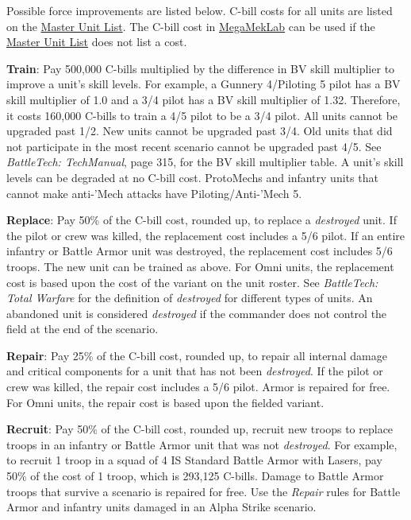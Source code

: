 Possible force improvements are listed below.
C-bill costs for all units are listed on the \href{http://www.masterunitlist.info}{Master Unit List}.
The C-bill cost in \href{https://megamek.org}{MegaMekLab} can be used if the \href{http://www.masterunitlist.info}{Master Unit List} does not list a cost.

\begin{description}

\item {\bfseries Train}: Pay 500,000 C-bills multiplied by the difference in BV skill multiplier to improve a unit's skill levels.
For example, a Gunnery 4/Piloting 5 pilot has a BV skill multiplier of 1.0 and a 3/4 pilot has a BV skill multiplier of 1.32.
Therefore, it costs 160,000 C-bills to train a 4/5 pilot to be a 3/4 pilot.
All units cannot be upgraded past 1/2.
New units cannot be upgraded past 3/4.
Old units that did not participate in the most recent scenario cannot be upgraded past 4/5.
See \emph{BattleTech: TechManual}, page 315, for the BV skill multiplier table.
A unit's skill levels can be degraded at no C-bill cost.
ProtoMechs and infantry units that cannot make anti-'Mech attacks have Piloting/Anti-'Mech 5.

\item {\bfseries Replace}: Pay 50\% of the C-bill cost, rounded up, to replace a \emph{destroyed} unit.
If the pilot or crew was killed, the replacement cost includes a 5/6 pilot.
If an entire infantry or Battle Armor unit was destroyed, the replacement cost includes 5/6 troops.
The new unit can be trained as above.
For Omni units, the replacement cost is based upon the cost of the variant on the unit roster.
See \emph{BattleTech: Total Warfare} for the definition of \emph{destroyed} for different types of units.
An abandoned unit is considered \emph{destroyed} if the commander does not control the field at the end of the scenario.

\item {\bfseries Repair}: Pay 25\% of the C-bill cost, rounded up, to repair all internal damage and critical components for a unit that has not been \emph{destroyed}.
If the pilot or crew was killed, the repair cost includes a 5/6 pilot.
Armor is repaired for free.
For Omni units, the repair cost is based upon the fielded variant.

\item {\bfseries Recruit}: Pay 50\% of the C-bill cost, rounded up, recruit new troops to replace troops in an infantry or Battle Armor unit that was not \emph{destroyed}.
For example, to recruit 1 troop in a squad of 4 IS Standard Battle Armor with Lasers, pay 50\% of the cost of 1 troop, which is 293,125 C-bills.
Damage to Battle Armor troops that survive a scenario is repaired for free.
Use the \emph{Repair} rules for Battle Armor and infantry units damaged in an Alpha Strike scenario.


\end{description}
